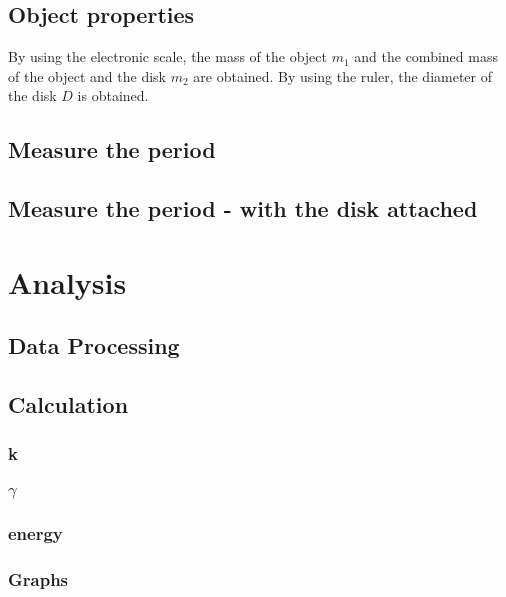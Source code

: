 \documentclass[11pt]{article}
\begin{document}
\subsection{Object properties}
By using the electronic scale, the mass of the object $m_1$ and the combined mass of the object and the disk $m_2$ are obtained. By using the ruler, the diameter of the disk $D$ is obtained. 

\subsection{Measure the period}
\subsection{Measure the period - with the disk attached}

\section{Analysis}
\subsection{Data Processing}

\subsection{Calculation}
\subsubsection{k}
\subsubsection{$\gamma$}
\subsubsection{energy}
\subsubsection{Graphs}


\end{document}
